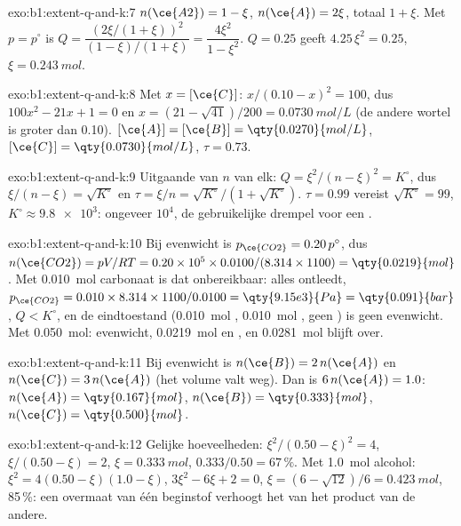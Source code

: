 \begin{solution}{exo:b1:extent-q-and-k:7}
$n(\ce{A2}) = 1 - \xi$, $n(\ce{A}) = 2\xi$, totaal $1 + \xi$. Met $p =
p^\circ$ is $Q = \dfrac{(2\xi/(1+\xi))^2}{(1-\xi)/(1+\xi)} = \dfrac{4\xi^2}{1 -
\xi^2}$. $Q = 0.25$ geeft $4.25\,\xi^2 = 0.25$, $\xi = \qty{0.243}{mol}$.
\end{solution}

\begin{solution}{exo:b1:extent-q-and-k:8}
Met $x = [\ce{C}]$: $x/(0.10 - x)^2 = 100$, dus $100x^2 - 21x + 1 = 0$ en
$x = (21 - \sqrt{41})/200 = \qty{0.0730}{mol/L}$ (de andere wortel is
groter dan 0.10). $[\ce{A}] = [\ce{B}] = \qty{0.0270}{mol/L}$, $[\ce{C}] =
\qty{0.0730}{mol/L}$, $\tau = 0.73$.
\end{solution}

\begin{solution}{exo:b1:extent-q-and-k:9}
Uitgaande van $n$ van elk: $Q = \xi^2/(n - \xi)^2 = K^\circ$, dus $\xi/(n - \xi) =
\sqrt{K^\circ}$ en $\tau = \xi/n = \sqrt{K^\circ}/(1 + \sqrt{K^\circ})$.
$\tau = 0.99$ vereist $\sqrt{K^\circ} = 99$, $K^\circ \approx \num{9.8e3}$:
ongeveer $10^4$, de gebruikelijke drempel voor een .
\end{solution}

\begin{solution}{exo:b1:extent-q-and-k:10}
Bij evenwicht is $p_{\ce{CO2}} = 0.20\,p^\circ$, dus $n(\ce{CO2}) =
pV/RT = 0.20 \times 10^5 \times 0.0100/(8.314 \times 1100) =
\qty{0.0219}{mol}$. Met \qty{0.010}{mol} carbonaat is dat onbereikbaar:
alles ontleedt, $p_{\ce{CO2}} = 0.010 \times 8.314 \times
1100/0.0100 = \qty{9.15e3}{Pa} = \qty{0.091}{bar}$, $Q < K^\circ$, en de
eindtoestand (\qty{0.010}{mol} , \qty{0.010}{mol} , geen
) is geen evenwicht. Met \qty{0.050}{mol}: evenwicht,
\qty{0.0219}{mol}  en , en \qty{0.0281}{mol} 
blijft over.
\end{solution}

\begin{solution}{exo:b1:extent-q-and-k:11}
Bij evenwicht is $n(\ce{B}) = 2\,n(\ce{A})$ en $n(\ce{C}) = 3\,n(\ce{A})$
(het volume valt weg). Dan is $6\,n(\ce{A}) = 1.0$: $n(\ce{A}) =
\qty{0.167}{mol}$, $n(\ce{B}) = \qty{0.333}{mol}$, $n(\ce{C}) =
\qty{0.500}{mol}$.
\end{solution}

\begin{solution}{exo:b1:extent-q-and-k:12}
Gelijke hoeveelheden: $\xi^2/(0.50 - \xi)^2 = 4$, $\xi/(0.50 - \xi) = 2$,
$\xi = \qty{0.333}{mol}$,  $0.333/0.50 = 67\,\%$. Met
\qty{1.0}{mol} alcohol: $\xi^2 = 4(0.50 - \xi)(1.0 - \xi)$, $3\xi^2 - 6\xi + 2 = 0$,
$\xi = (6 - \sqrt{12})/6 = \qty{0.423}{mol}$,  85\,\%: een
overmaat van één beginstof verhoogt het  van het product van de
andere.
\end{solution}

